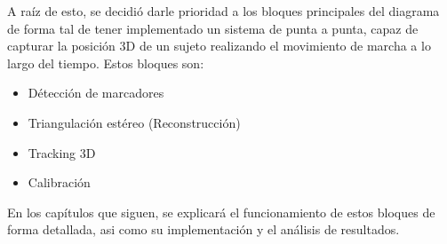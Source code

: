  A raíz de esto, se decidió darle prioridad a los bloques principales del diagrama de forma tal de tener implementado un sistema de punta a punta, capaz de capturar la posición 3D de un sujeto realizando el movimiento de marcha a lo largo del tiempo. Estos bloques son:
 \begin{itemize}
 	\item Détección de marcadores
 	\item Triangulación estéreo (Reconstrucción)
 	\item Tracking 3D
 	\item Calibración
 \end{itemize}

En los capítulos que siguen, se explicará el funcionamiento de estos bloques de forma detallada, asi como su implementación y el análisis de resultados.